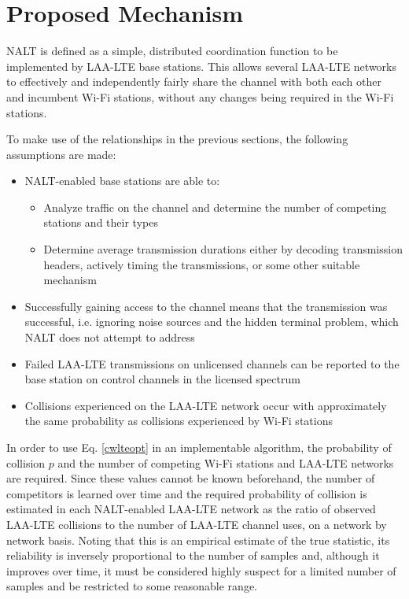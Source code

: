 \section{Proposed Mechanism}
\label{proposed}
NALT is defined as a simple, distributed coordination function to be implemented by \mbox{LAA-LTE} base stations.  This allows several \mbox{LAA-LTE} networks to effectively and independently fairly share the channel with both each other and incumbent \mbox{Wi-Fi} stations, without any changes being required in the \mbox{Wi-Fi} stations.

To make use of the relationships in the previous sections, the following assumptions are made:
\begin{itemize}
	\item NALT-enabled base stations are able to:
	\begin{itemize}
	\item Analyze traffic on the channel and determine the number of competing stations and their types
	\item Determine average transmission durations either by decoding transmission headers, actively timing the transmissions, or some other suitable mechanism
	\end{itemize} 
	\item Successfully gaining access to the channel means that the transmission was successful, i.e. ignoring noise sources and the hidden terminal problem, which NALT does not attempt to address
	\item Failed \mbox{\mbox{LAA-LTE}} transmissions on unlicensed channels can be reported to the base station on control channels in the licensed spectrum
	\item Collisions experienced on the \mbox{LAA-LTE} network occur with approximately the same probability as collisions experienced by \mbox{Wi-Fi} stations
\end{itemize}

In order to use Eq. \ref{cwlteopt} in an implementable algorithm, the probability of collision  $p$ and the number of competing \mbox{Wi-Fi} stations and \mbox{LAA-LTE} networks are required. Since these values cannot be known beforehand, the number of competitors is learned over time and the required probability of collision is estimated in each NALT-enabled \mbox{LAA-LTE} network as the ratio of observed \mbox{\mbox{LAA-LTE}} collisions to the number of \mbox{\mbox{LAA-LTE}} channel uses, on a network by network basis.  Noting that this is an empirical estimate of the true statistic, its reliability is inversely proportional to the number of samples and, although it improves over time, it must be considered highly suspect for a limited number of samples and be restricted to some reasonable range. 

